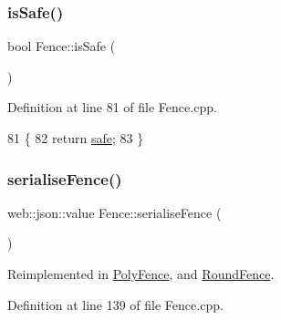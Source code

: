 \subsubsection{\texorpdfstring{is\+Safe()}{isSafe()}}
{\footnotesize\ttfamily bool Fence\+::is\+Safe (\begin{DoxyParamCaption}{ }\end{DoxyParamCaption})}



Definition at line 81 of file Fence.\+cpp.


\begin{DoxyCode}
81                    \{
82     \textcolor{keywordflow}{return} \hyperlink{class_fence_ad570430040eee657c625a67d5589c4b5}{safe};
83 \}
\end{DoxyCode}
\mbox{\label{class_fence_a5c8529e80a4444cc9ca0fb660cbf07c8}} 
\subsubsection{\texorpdfstring{serialise\+Fence()}{serialiseFence()}}
{\footnotesize\ttfamily web\+::json\+::value Fence\+::serialise\+Fence (\begin{DoxyParamCaption}{ }\end{DoxyParamCaption})\hspace{0.3cm}{\ttfamily [virtual]}}



Reimplemented in \hyperlink{class_poly_fence_ae748da10e4fd15f87b74e0d996f00103}{Poly\+Fence}, and \hyperlink{class_round_fence_ae9dd3e4291f7509ce557a6c28cdd682d}{Round\+Fence}.



Definition at line 139 of file Fence.\+cpp.


